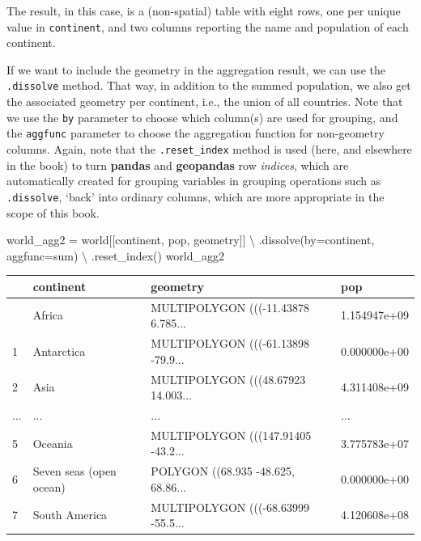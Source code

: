 \documentclass[
  letterpaper,
]{krantz}
\newenvironment{Shaded}{\begin{snugshade}}{\end{snugshade}}
\newcommand{\NormalTok}[1]{\textcolor[rgb]{0.00,0.23,0.31}{#1}}
\newcommand{\OperatorTok}[1]{\textcolor[rgb]{0.37,0.37,0.37}{#1}}
\newcommand{\StringTok}[1]{\textcolor[rgb]{0.13,0.47,0.30}{#1}}
\begin{document}
The result, in this case, is a (non-spatial) table with eight rows, one
per unique value in \texttt{continent}, and two columns reporting the
name and population of each continent.

If we want to include the geometry in the aggregation result, we can use
the \texttt{.dissolve} method. That way, in addition to the summed
population, we also get the associated geometry per continent, i.e., the
union of all countries. Note that we use the \texttt{by} parameter to
choose which column(s) are used for grouping, and the \texttt{aggfunc}
parameter to choose the aggregation function for non-geometry columns.
Again, note that the \texttt{.reset\_index} method is used (here, and
elsewhere in the book) to turn \textbf{pandas} and \textbf{geopandas}
row \emph{indices}, which are automatically created for grouping
variables in grouping operations such as \texttt{.dissolve}, `back' into
ordinary columns, which are more appropriate in the scope of this book.

\begin{Shaded}
\begin{Highlighting}[]
\NormalTok{world\_agg2 }\OperatorTok{=}\NormalTok{ world[[}\StringTok{\textquotesingle{}continent\textquotesingle{}}\NormalTok{, }\StringTok{\textquotesingle{}pop\textquotesingle{}}\NormalTok{, }\StringTok{\textquotesingle{}geometry\textquotesingle{}}\NormalTok{]] }\OperatorTok{\textbackslash{}}
\NormalTok{    .dissolve(by}\OperatorTok{=}\StringTok{\textquotesingle{}continent\textquotesingle{}}\NormalTok{, aggfunc}\OperatorTok{=}\StringTok{\textquotesingle{}sum\textquotesingle{}}\NormalTok{) }\OperatorTok{\textbackslash{}}
\NormalTok{    .reset\_index()}
\NormalTok{world\_agg2}
\end{Highlighting}
\end{Shaded}

\begin{longtable}[]{@{}llll@{}}
\toprule\noalign{}
& continent & geometry & pop \\
\midrule\noalign{}
\endhead
\bottomrule\noalign{}
\endlastfoot
0 & Africa & MULTIPOLYGON (((-11.43878 6.785... & 1.154947e+09 \\
1 & Antarctica & MULTIPOLYGON (((-61.13898 -79.9... & 0.000000e+00 \\
2 & Asia & MULTIPOLYGON (((48.67923 14.003... & 4.311408e+09 \\
... & ... & ... & ... \\
5 & Oceania & MULTIPOLYGON (((147.91405 -43.2... & 3.775783e+07 \\
6 & Seven seas (open ocean) & POLYGON ((68.935 -48.625, 68.86... &
0.000000e+00 \\
7 & South America & MULTIPOLYGON (((-68.63999 -55.5... & 4.120608e+08 \\
\end{longtable}
\end{document}
